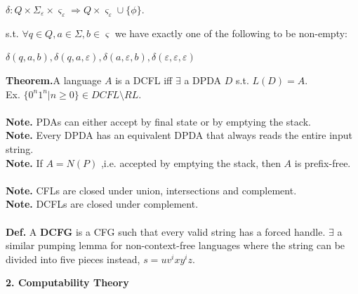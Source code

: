 \documentclass[12pt]{article}
\begin{document}
\begin{multicols}{2}
\begin{center}
$\delta : Q \times \Sigma_{\varepsilon} \times \varsigma_{\varepsilon} \Rightarrow Q \times \varsigma_{\varepsilon} \cup \lbrace \phi \rbrace.$
\end{center}
s.t. $\forall q \in Q, a \in \Sigma, b \in \varsigma$ we have exactly one of the following to be non-empty:
\begin{center}
$\delta(q,a,b), \delta(q,a,\varepsilon), \delta(a,\varepsilon,b), \delta(\varepsilon,\varepsilon,\varepsilon)$
\end{center}
\textbf{Theorem.}A language $A$ is a DCFL iff $\exists$ a DPDA $D$ s.t. $L(D) = A.$\\
Ex. $\lbrace 0^{n}1^{n} | n \geq 0 \rbrace \in DCFL \setminus RL.$\\\\
\textbf{Note.} PDAs can either accept by final state or by emptying the stack.\\
\textbf{Note.} Every DPDA has an equivalent DPDA that always reads the entire input string.\\
\textbf{Note.} If $A = N(P)$ ,i.e. accepted by emptying the stack, then $A$ is prefix-free.\\\\
\textbf{Note.} CFLs are closed under union, intersections and complement.\\
\textbf{Note.} DCFLs are closed under complement.\\\\
\textbf{Def.} A \textbf{DCFG} is a CFG such that every valid string has a forced handle.
$\exists$ a similar pumping lemma for non-context-free languages where the string can be divided into five pieces instead, $s = uv^{i}xy^{i}z.$
\end{multicols}\bigskip
\large
\noindent\textbf{2. Computability Theory}
\small
\end{document}
